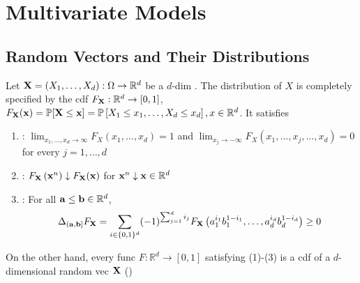 \section{Multivariate Models}


\subsection*{Random Vectors and Their Distributions}
Let $\boldsymbol{\mathbf{X}}=\left(X_{1}, \ldots, X_{d}\right): \Omega \rightarrow \mathbb{R}^{d}$ be a $d$-dim . The distribution of $X$ is completely specified by the cdf $F_{\boldsymbol{\mathbf{X}}}: \mathbb{R}^{d} \rightarrow[0,1]$, $F_{\boldsymbol{\mathbf{X}}}(\boldsymbol{\mathbf{x}})=\mathbb{P}[\boldsymbol{\mathbf{X}} \leq \boldsymbol{\mathbf{x}}]=\mathbb{P}\left[X_{1} \leq x_{1}, \ldots, X_{d} \leq x_{d}\right], x \in \mathbb{R}^{d}$. It satisfies
\begin{enumerate}[label = (\arabic*), leftmargin=*]
    \item {}:
$\displaystyle \lim _{x_{1}, \ldots, x_{d} \rightarrow \infty} F_{X}\left(x_{1}, \ldots, x_{d}\right)=1$ and $\displaystyle \lim _{x_{j} \rightarrow-\infty} F_{X}\left(x_{1}, \ldots, x_{j}, \ldots, x_{d}\right)=0$ for every $j=1, \ldots, d$
    \item {}: $F_{\operatorname{\boldsymbol{\mathbf{X}}}}\left(\operatorname{\boldsymbol{\mathbf{x}}}^{n}\right) \downarrow F_{\operatorname{\boldsymbol{\mathbf{X}}}}(\operatorname{\boldsymbol{\mathbf{x}}})$ for $\operatorname{\boldsymbol{\mathbf{x}}}^{n} \downarrow \operatorname{\boldsymbol{\mathbf{x}}} \in \mathbb{R}^{d}$
    \item {}: For all $\operatorname{\boldsymbol{\mathbf{a}}} \leq \operatorname{\boldsymbol{\mathbf{b}}} \in \mathbb{R}^{d}$,
$$
\Delta_{(\operatorname{\boldsymbol{\mathbf{a}}}, \operatorname{\boldsymbol{\mathbf{b}}}]} F_{\boldsymbol{\mathbf{X}}}=\sum_{i \in\{0,1\}^{d}}(-1)^{\sum_{j=1}^{d} i_{j}} F_{\boldsymbol{\mathbf{X}}}\left(a_{1}^{i_{1}} b_{1}^{1-i_{1}}, \ldots, a_{d}^{i_{d}} b_{d}^{1-i_{d}}\right) \geq 0
$$
\end{enumerate}
On the other hand, every func $F: \mathbb{R}^{d} \rightarrow[0,1]$ satisfying (1)-(3) is a cdf of a $d$-dimensional random vec $\boldsymbol{\mathbf{X}}$ ()

